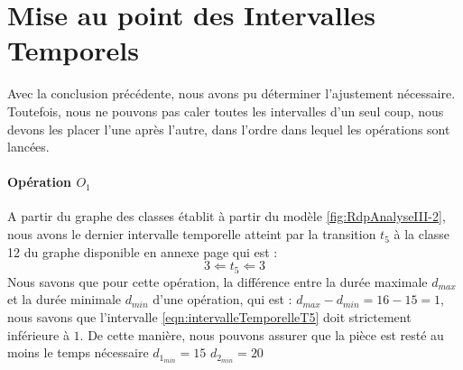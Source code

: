 
\section{Mise au point des Intervalles Temporels}
Avec la conclusion précédente, nous avons pu déterminer l'ajustement nécessaire. Toutefois, nous ne pouvons pas caler toutes les intervalles d'un seul coup, nous devons les placer l'une après l'autre, dans l'ordre dans lequel les opérations sont lancées.

\paragraph*{Opération $O_1$}
A partir du graphe des classes établit à partir du modèle \ref{fig:RdpAnalyseIII-2}, nous avons le dernier intervalle temporelle atteint par la transition $t_5$ à la classe 12 du graphe disponible en annexe page \pageref{Annex:analyse} qui est :
\begin{equation}\label{eqn:intervalleTemporelleT5}
3 \Leftarrow t_5 \Leftarrow 3
\end{equation} 
Nous savons que pour cette opération, la différence entre la durée maximale $d_{max}$ et la durée minimale $d_{min}$ d'une opération, qui est : $d_{max} - d_{min} = 16-15 = 1$, nous savons que l'intervalle \ref{eqn:intervalleTemporelleT5} doit strictement inférieure à $1$. De cette manière, nous pouvons assurer que la pièce est resté au moins le temps nécessaire 
$d_{1_{min}} = 15$
$d_{2_{min}} = 20$